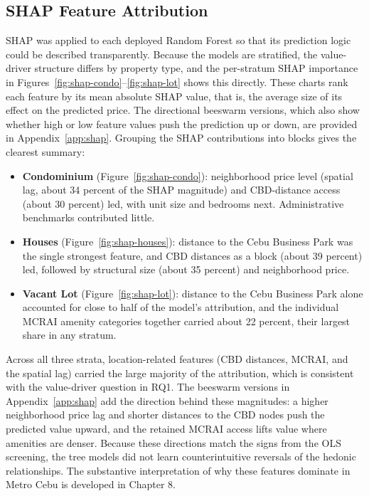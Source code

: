 \subsection{SHAP Feature Attribution}\label{shap-feature-attribution}

SHAP was applied to each deployed Random Forest so that its prediction logic could be described transparently. Because the models are stratified, the value-driver structure differs by property type, and the per-stratum SHAP importance in Figures~\ref{fig:shap-condo}--\ref{fig:shap-lot} shows this directly. These charts rank each feature by its mean absolute SHAP value, that is, the average size of its effect on the predicted price. The directional beeswarm versions, which also show whether high or low feature values push the prediction up or down, are provided in Appendix~\ref{app:shap}. Grouping the SHAP contributions into blocks gives the clearest summary:

\begin{itemize}
\item \textbf{Condominium} (Figure~\ref{fig:shap-condo}): neighborhood price level (spatial lag, about 34 percent of the SHAP magnitude) and CBD-distance access (about 30 percent) led, with unit size and bedrooms next. Administrative benchmarks contributed little.
\item \textbf{Houses} (Figure~\ref{fig:shap-houses}): distance to the Cebu Business Park was the single strongest feature, and CBD distances as a block (about 39 percent) led, followed by structural size (about 35 percent) and neighborhood price.
\item \textbf{Vacant Lot} (Figure~\ref{fig:shap-lot}): distance to the Cebu Business Park alone accounted for close to half of the model's attribution, and the individual MCRAI amenity categories together carried about 22 percent, their largest share in any stratum.
\end{itemize}

Across all three strata, location-related features (CBD distances, MCRAI, and the spatial lag) carried the large majority of the attribution, which is consistent with the value-driver question in RQ1. The beeswarm versions in Appendix~\ref{app:shap} add the direction behind these magnitudes: a higher neighborhood price lag and shorter distances to the CBD nodes push the predicted value upward, and the retained MCRAI access lifts value where amenities are denser. Because these directions match the signs from the OLS screening, the tree models did not learn counterintuitive reversals of the hedonic relationships. The substantive interpretation of why these features dominate in Metro Cebu is developed in Chapter 8.

